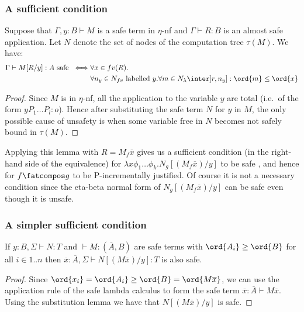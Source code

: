\subsubsection{A sufficient condition}
\begin{lemma}
Suppose that $\Gamma,y:B \vdash M$ is a safe term in $\eta$-nf and $\Gamma \vdash R : B$ is an almost safe application. Let $N$ denote the set of nodes of the computation tree $\tau(M)$. We have:
\begin{align*}
\Gamma \vdash M[R/y] :A \mbox{ safe } 
\iff&  \forall x \in fv(R) . \\
    & \forall n_y \in N_{fv} \mbox{ labelled $y$}.
      \forall m \in N_{\lambda} \inter ]r,n_y] : \ord{m} \leq \ord{x}
\end{align*}
\end{lemma}
\begin{proof}
Since $M$ is in $\eta$-nf, all the application to the variable $y$ are total (i.e.~of the form $y P_1 \ldots P_l :o$). Hence after substituting the safe term $N$ for $y$ in $M$, the only possible cause of unsafety is when
some variable free in $N$ becomes not safely bound in $\tau(M)$.
\end{proof}

Applying this lemma with $R= M_f \overline{x}$ gives us a sufficient condition (in the right-hand side of the equivalence) 
for $\lambda x \phi_1 \dots \phi_k. N_g [(M_f \overline{x}) / y]$ to be safe , and hence for $f\fatcompos g$ to be P-incrementally justified. Of course it is not a necessary condition since the 
eta-beta normal form of  $N_g[(M_f \overline{x}) /y]$ can be safe even though it is unsafe.

\subsubsection{A simpler sufficient condition}
\begin{lemma}
If $y:B, \Sigma \vdash N : T$ and $\vdash M : (\overline{A}, B)$ 
are safe terms with $\ord{A_i} \geq \ord{B}$ for all $i\in 1..n$
then $\overline{x}:\overline{A}, \Sigma \vdash N[(M \overline{x})/y] :T$ is also safe.
\end{lemma}
\begin{proof}
Since $\ord{x_i} = \ord{A_i} \geq \ord{B} = \ord{M \overline{x}}$, we can use the application 
rule of the safe lambda calculus to form the safe term $\overline{x}:\overline{A} \vdash M \overline{x}$.
Using the substitution lemma we have that $N[(M \overline{x})/y]$ is safe.
\end{proof}

